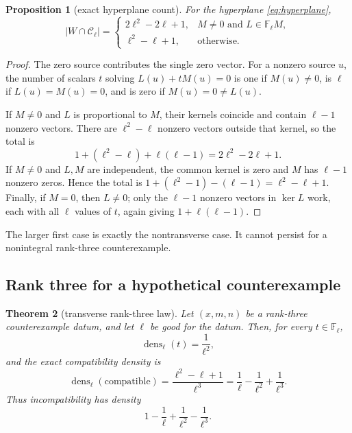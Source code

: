 \documentclass[11pt,oneside]{article}
\newtheorem{theorem}{Theorem}[section]
\newtheorem{proposition}[theorem]{Proposition}
\theoremstyle{definition}
\theoremstyle{remark}
\newcommand{\F}{\mathbb{F}}
\newcommand{\dens}{\operatorname{dens}}
\begin{document}
\begin{proposition}[exact hyperplane count]\label{prop:hyperplane-count}
For the hyperplane \eqref{eq:hyperplane},
\[
 |W\cap\mathcal C_\ell|=
 \begin{cases}
  2\ell^2-2\ell+1,
     & M\ne0\text{ and }L\in\F_\ell M,\\[2mm]
  \ell^2-\ell+1,
     & \text{otherwise}.
 \end{cases}
\]
\end{proposition}

\begin{proof}
The zero source contributes the single zero vector.  For a nonzero source
$u$, the number of scalars $t$ solving $L(u)+tM(u)=0$ is one if
$M(u)\ne0$, is $\ell$ if $L(u)=M(u)=0$, and is zero if
$M(u)=0\ne L(u)$.

If $M\ne0$ and $L$ is proportional to $M$, their kernels coincide and contain
$\ell-1$ nonzero vectors.  There are $\ell^2-\ell$ nonzero vectors outside
that kernel, so the total is
\[
 1+(\ell^2-\ell)+\ell(\ell-1)=2\ell^2-2\ell+1.
\]
If $M\ne0$ and $L,M$ are independent, the common kernel is zero and
$M$ has $\ell-1$ nonzero zeros.  Hence the total is
$1+(\ell^2-1)-(\ell-1)=\ell^2-\ell+1$.  Finally, if $M=0$, then $L\ne0$;
only the $\ell-1$ nonzero vectors in $\ker L$ work, each with all $\ell$
values of $t$, again giving $1+\ell(\ell-1)$.
\end{proof}

The larger first case is exactly the nontransverse case.  It cannot persist
for a nonintegral rank-three counterexample.

\subsection{Rank three for a hypothetical counterexample}

\begin{theorem}[transverse rank-three law]\label{thm:rank3-law}
Let $(x,m,n)$ be a rank-three counterexample datum, and let $\ell$ be good for
the datum.  Then, for every $t\in\F_\ell$,
\[
 \dens_\ell(t)=\frac1{\ell^2},
\]
and the exact compatibility density is
\begin{equation}\label{eq:rank3-compatible}
 \dens_\ell(\mathrm{compatible})
 =\frac{\ell^2-\ell+1}{\ell^3}
 =\frac1\ell-\frac1{\ell^2}+\frac1{\ell^3}.
\end{equation}
Thus incompatibility has density
\begin{equation}\label{eq:rank3-incompatible}
 1-\frac1\ell+\frac1{\ell^2}-\frac1{\ell^3}.
\end{equation}
\end{theorem}
\end{document}
